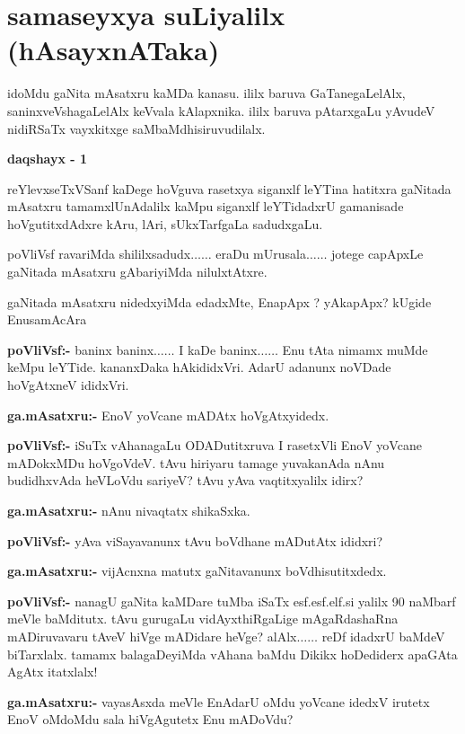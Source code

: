 \chapter{samaseyxya suLiyalilx (hAsayxnATaka)} 

idoMdu gaNita mAsatxru kaMDa kanasu. ililx baruva GaTanegaLelAlx, saninxveVshagaLelAlx keVvala kAlapxnika. ililx baruva pAtarxgaLu yAvudeV nidiRSaTx vayxkitxge saMbaMdhisiruvudilalx. 
\begin{center}
{\bf  daqshayx - {\rm 1}}
\end{center}

reYlevxseTxVSanf kaDege hoVguva rasetxya siganxlf leYTina hatitxra gaNitada mAsatxru tamamxlUnAdalilx kaMpu siganxlf leYTidadxrU gamanisade hoVgutitxdAdxre kAru, lAri, sUkxTarfgaLa sadudxgaLu.

poVliVsf ravariMda shililxsadudx$\ldots\ldots$ eraDu mUrusala$\ldots\ldots$ jotege capApxLe gaNitada mAsatxru gAbariyiMda nilulxtAtxre.

gaNitada mAsatxru nidedxyiMda edadxMte, EnapApx ? yAkapApx? kUgide EnusamAcAra

\noindent
\textbf{poVliVsf:-} baninx baninx$\ldots\ldots$ I kaDe baninx$\ldots\ldots$ Enu tAta nimamx muMde keMpu leYTide. kananxDaka hAkididxVri. AdarU adanunx noVDade hoVgAtxneV ididxVri.

\smallskip
\noindent
\textbf{ga.mAsatxru:-} EnoV yoVcane mADAtx hoVgAtxyidedx.

\smallskip
\noindent
\textbf{poVliVsf:-} iSuTx vAhanagaLu ODADutitxruva I rasetxVli EnoV yoVcane mADokxMDu hoVgoVdeV. tAvu hiriyaru tamage yuvakanAda nAnu budidhxvAda heVLoVdu sariyeV? tAvu yAva vaqtitxyalilx idirx?

\smallskip
\noindent
\textbf{ga.mAsatxru:-} nAnu nivaqtatx shikaSxka.

\smallskip
\noindent
\textbf{poVliVsf:-} yAva viSayavanunx tAvu boVdhane mADutAtx ididxri?

\smallskip
\noindent
\textbf{ga.mAsatxru:-} vijAcnxna matutx gaNitavanunx boVdhisutitxdedx.

\smallskip
\noindent
\textbf{poVliVsf:-} nanagU gaNita kaMDare tuMba iSaTx esf.esf.elf.si yalilx {\rm 90} naMbarf meVle baMditutx. tAvu gurugaLu vidAyxthiRgaLige mAgaRdashaRna mADiruvavaru tAveV hiVge mADidare heVge? alAlx$\ldots\ldots$ reDf idadxrU baMdeV biTarxlalx. tamamx balagaDeyiMda vAhana baMdu Dikikx hoDediderx apaGAta AgAtx itatxlalx!

\smallskip
\noindent
\textbf{ga.mAsatxru:-} vayasAsxda meVle EnAdarU oMdu yoVcane idedxV irutetx EnoV oMdoMdu sala hiVgAgutetx Enu mADoVdu?

